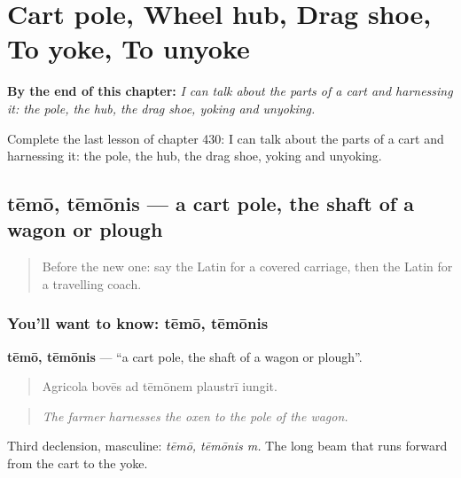 
\chapter{Cart pole, Wheel hub, Drag shoe, To yoke, To unyoke}
\label{ch:la-cart-pole-wheel-hub-drag-shoe-to-yoke-to-unyoke}

\begin{chapteropening}
\textbf{By the end of this chapter:} \emph{I can talk about the parts of a cart and harnessing it: the pole, the hub, the drag shoe, yoking and unyoking.}

Complete the last lesson of chapter 430: I can talk about the parts of a cart and harnessing it: the pole, the hub, the drag shoe, yoking and unyoking.
\end{chapteropening}

\section[tēmō, tēmōnis]{tēmō, tēmōnis — a cart pole, the shaft of a wagon or plough}

\label{lesson:LA-C430-temo}



\begin{quote}
Before the new one: say the Latin for a covered carriage, then the Latin for a travelling coach.
\end{quote}

\subsection*{You'll want to know: tēmō, tēmōnis}
\textbf{tēmō, tēmōnis} — \textquotedblleft{}a cart pole, the shaft of a wagon or plough\textquotedblright{}.

\begin{quote}
Agricola bovēs ad tēmōnem plaustrī iungit.
\end{quote}

\begin{quote}
\emph{The farmer harnesses the oxen to the pole of the wagon.}
\end{quote}

Third declension, masculine: \emph{tēmō, tēmōnis m.} The long beam that runs forward from the cart to the yoke.

